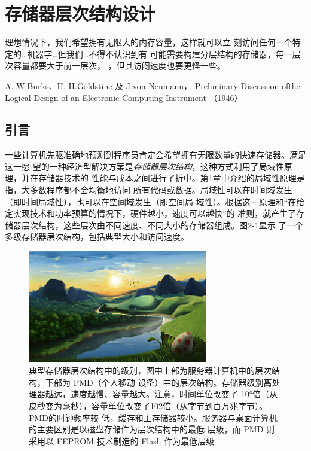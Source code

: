\chapter{存储器层次结构设计}

\begin{flushright}
\epigraph{理想情况下，我们希望拥有无限大的内存容量，这样就可以立
刻访问任何一个特定的…机器字…但我们…不得不认识到有
可能需要构建分层结构的存储器，每一层次容量都要大于前一层次，
，但其访闷速度也要更怪一些。}{A. W.Burks、H. H.Goldstine 及
J.von Neumann，
Preliminary Discussion ofthe
Logical Design of an Electronic
Computing Instrument （1946）}
\end{flushright}
\newpage

\section{引言}
一些计算机先驱准确地预测到程序员肯定会希望拥有无限数量的快速存储器。满足这一愿
望的一种经济型解决方案是\emph{存储器层次结构}，这种方式利用了局域性原理，并在存储器技术的
性能与成本之间进行了折中。\hyperref[subsec:PrincipleOfLocality]{第1章中介绍的局域性原理}是指，大多数程序都不会均衡地访问
所有代码或数据。局域性可以在时间域发生（即时间局域性），也可以在空间域发生（即空间局
域性）。根据这一原理和“在给定实现技术和功率预算的情况下，硬件越小，速度可以越快”的
准则，就产生了存储器层次结构，这些层次由不同速度、不同大小的存储器组成。图2-1显示
了一个多级存储器层次结构，包括典型大小和访问速度。

\begin{figure}[!htb]
    \centering
	\includegraphics[width=0.7\textwidth]{imgs/sam.png}
	\caption{典型存储器层次结构中的级别，图中上部为服务器计算机中的层次结构，下部为 PMD（个人移动
            设备）中的层次结构。存储器级别离处理器越远，速度越慢、容量越大。注意，时间单位改变了
            10°倍（从皮秒变为毫秒），容量单位改变了102倍（从字节到百万兆字节）。PMD的时钟频率较
            低，缓存和主存储器较小。服务器与桌面计算机的主要区别是以磁盘存储作为层次结构中的最低
            层级，而 PMD 则采用以 EEPROM 技术制造的 Flash 作为最低层级}
\end{figure}

